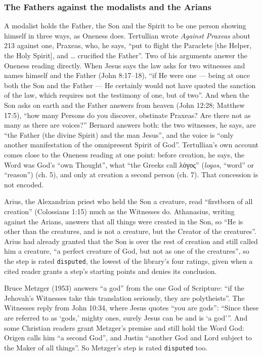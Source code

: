 \documentclass[11pt,paper=\testimonypaper,DIV=13,parskip=false]{scrartcl}
\begin{document}
\subsubsection*{The Fathers against the modalists and the Arians}
A modalist holds the Father, the Son and the Spirit to be one person showing himself in three ways, as Oneness does. Tertullian wrote \emph{Against Praxeas} about 213 against one, Praxeas, who, he says, “put to flight the Paraclete [the Helper, the Holy Spirit], and … crucified the Father”. Two of his arguments answer the Oneness reading directly. When Jesus says the law asks for two witnesses and names himself and the Father (John 8:17–18), “if He were one — being at once both the Son and the Father — He certainly would not have quoted the sanction of the law, which requires not the testimony of one, but of two”. And when the Son asks on earth and the Father answers from heaven (John 12:28; Matthew 17:5), “how many Persons do you discover, obstinate Praxeas? Are there not as many as there are voices?” Bernard answers both: the two witnesses, he says, are “the Father (the divine Spirit) and the man Jesus”, and the voice is “only another manifestation of the omnipresent Spirit of God”. Tertullian’s own account comes close to the Oneness reading at one point: before creation, he says, the Word was God’s “own Thought”, what “the Greeks call λόγος” (\emph{logos}, “word” or “reason”) (ch. 5), and only at creation a second person (ch. 7). That concession is not encoded.

Arius, the Alexandrian priest who held the Son a creature, read “firstborn of all creation” (Colossians 1:15) much as the Witnesses do. Athanasius, writing against the Arians, answers that all things were created in the Son, so “He is other than the creatures, and is not a creature, but the Creator of the creatures”. Arius had already granted that the Son is over the rest of creation and still called him a creature, “a perfect creature of God, but not as one of the creatures”, so the step is rated \texttt{disputed}, the lowest of the library’s four ratings, given when a cited reader grants a step’s starting points and denies its conclusion.

Bruce Metzger (1953) answers “a god” from the one God of Scripture: “if the Jehovah’s Witnesses take this translation seriously, they are polytheists”. The Witnesses reply from John 10:34, where Jesus quotes “you are gods”: “Since these are referred to as ‘gods,’ mighty ones, surely Jesus can be and is ‘a god’”. And some Christian readers grant Metzger’s premise and still hold the Word God: Origen calls him “a second God”, and Justin “another God and Lord subject to the Maker of all things”. So Metzger’s step is rated \texttt{disputed} too.
\end{document}
